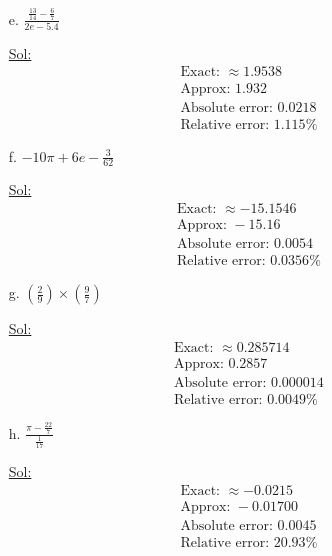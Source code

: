 \begin{enumerate}
\begin{itemize}
    \item[e.] \( \frac{\frac{13}{14} - \frac{6}{7}}{2e - 5.4} \)

      \underline{Sol:}\\
      \[
        \begin{array}{l}
          \textrm{Exact: } \approx 1.9538 \\
          \textrm{Approx: } 1.932 \\
          \textrm{Absolute error: } 0.0218 \\
          \textrm{Relative error: } 1.115\%
        \end{array}
      \]
      \bigbreak

    \item[f.] \( -10\pi + 6e - \frac{3}{62} \)

      \underline{Sol:}\\
      \[
        \begin{array}{l}
          \textrm{Exact: } \approx -15.1546 \\
          \textrm{Approx: } -15.16 \\
          \textrm{Absolute error: } 0.0054 \\
          \textrm{Relative error: } 0.0356\%
        \end{array}
      \]
      \bigbreak

    \item[g.] \( \left( \frac{2}{9} \right) \times \left( \frac{9}{7} \right) \)

      \underline{Sol:}\\
      \[
        \begin{array}{l}
          \textrm{Exact: } \approx 0.285714 \\
          \textrm{Approx: } 0.2857 \\
          \textrm{Absolute error: } 0.000014 \\
          \textrm{Relative error: } 0.0049\%
        \end{array}
      \]
      \bigbreak

    \item[h.] \( \frac{\pi - \frac{22}{7}}{\frac{1}{17}} \)

      \underline{Sol:}\\
      \[
        \begin{array}{l}
          \textrm{Exact: } \approx -0.0215 \\
          \textrm{Approx: } -0.01700 \\
          \textrm{Absolute error: } 0.0045 \\
          \textrm{Relative error: } 20.93\%
        \end{array}
      \]
      \bigbreak
  \end{itemize}


\end{enumerate}
